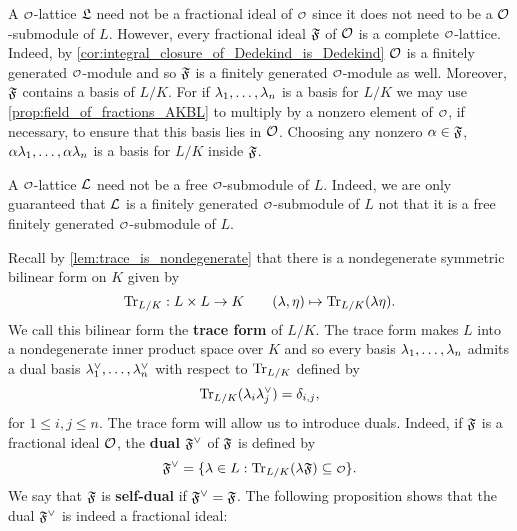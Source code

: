     A $\smc{O}$-lattice $\mathfrak{L}$ need not be a fractional ideal of $\smc{O}$ since it does not need to be a $\mathcal{O}$-submodule of $L$. However, every fractional ideal $\mathfrak{F}$ of $\mathcal{O}$ is a complete $\smc{O}$-lattice. Indeed, by \cref{cor:integral_closure_of_Dedekind_is_Dedekind} $\mathcal{O}$ is a finitely generated $\smc{O}$-module and so $\mathfrak{F}$ is a finitely generated $\smc{O}$-module as well. Moreover, $\mathfrak{F}$ contains a basis of $L/K$. For if $\lambda_{1},\ldots,\lambda_{n}$ is a basis for $L/K$ we may use \cref{prop:field_of_fractions_AKBL} to multiply by a nonzero element of $\smc{O}$, if necessary, to ensure that this basis lies in $\mathcal{O}$. Choosing any nonzero $\alpha \in \mathfrak{F}$, $\alpha\lambda_{1},\ldots,\alpha\lambda_{n}$ is a basis for $L/K$ inside $\mathfrak{F}$.

    \begin{remark}
      A $\smc{O}$-lattice $\mathcal{L}$ need not be a free $\smc{O}$-submodule of $L$. Indeed, we are only guaranteed that $\mathcal{L}$ is a finitely generated $\smc{O}$-submodule of $L$ not that it is a free finitely generated $\smc{O}$-submodule of $L$.
    \end{remark}
    
    Recall by \cref{lem:trace_is_nondegenerate} that there is a nondegenerate symmetric bilinear form on $K$ given by
    \[
      \operatorname{\mathrm{Tr}}_{L/K}:L \times L \to K \qquad (\lambda,\eta) \mapsto \operatorname{\mathrm{Tr}}_{L/K}(\lambda\eta).
    \]
    We call this bilinear form the \textbf{trace form} of $L/K$. The trace form makes $L$ into a nondegenerate inner product space over $K$ and so every basis $\lambda_{1},\ldots,\lambda_{n}$ admits a dual basis $\lambda_{1}^{\vee},\ldots,\lambda_{n}^{\vee}$ with respect to $\operatorname{\mathrm{Tr}}_{L/K}$ defined by
    \[
      \operatorname{\mathrm{Tr}}_{L/K}(\lambda_{i}\lambda_{j}^{\vee}) = \delta_{i,j},
    \]
    for $1 \le i,j \le n$. The trace form will allow us to introduce duals. Indeed, if $\mathfrak{F}$ is a fractional ideal $\mathcal{O}$, the \textbf{dual} $\mathfrak{F}^{\vee}$ of $\mathfrak{F}$ is defined by
    \[
      \mf{F}^{\vee} = \{\l \in L:\Trace_{L/K}(\l\mf{F}) \subseteq \smc{O}\}.
    \]
    We say that $\mathfrak{F}$ is \textbf{self-dual} if $\mathfrak{F}^{\vee} = \mathfrak{F}$. The following proposition shows that the dual $\mathfrak{F}^{\vee}$ is indeed a fractional ideal:

